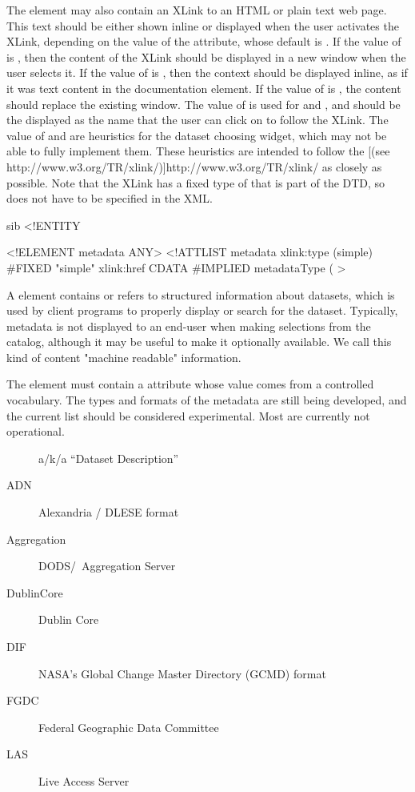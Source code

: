 The  element may also contain an XLink to an
HTML or plain text web page. This text should be either shown inline
or displayed when the user activates the XLink, depending on the value
of the  attribute, whose default is . If the
value of  is , then the content of the XLink
should be displayed in a new window when the user selects it. If the
value of  is , then the context should be
displayed inline, as if it was text content in the documentation
element.  If the value of  is , the
content should replace the existing window. The value of
 is used for  and , and should
be the displayed as the name that the user can click on to follow the
XLink. The value of  and  are
heuristics for the dataset choosing widget, which may not be able to
fully implement them. These heuristics are intended to follow the
[(see
http://www.w3.org/TR/xlink/)]{http://www.w3.org/TR/xlink/} as closely
as possible. Note that the XLink has a fixed type of  that
is part of the DTD, so does not have to be specified in the XML.

 

\begin{vcode}{sib}
<!ENTITY %

<!ELEMENT metadata ANY>
<!ATTLIST metadata
    xlink:type (simple) #FIXED "simple"
    xlink:href CDATA #IMPLIED
    metadataType (%
>
\end{vcode}

A  element contains or refers to structured
information about datasets, which is used by client programs to
properly display or search for the dataset.  Typically, metadata is
not displayed to an end-user when making selections from the catalog,
although it may be useful to make it optionally available. We call
this kind of content "machine readable" information.

The  element must contain a 
attribute whose value comes from a controlled vocabulary. The types
and formats of the metadata are still being developed, and the current
list should be considered experimental. Most are currently not
operational.

\begin{description}
\item[\thredds] a/k/a ``Dataset Description''
\item[ADN] Alexandria / DLESE format
\item[Aggregation] DODS/\opendap\ Aggregation Server
\item[DublinCore] Dublin Core
\item[DIF] NASA's Global Change Master Directory (GCMD) format
\item[FGDC] Federal Geographic Data Committee
\item[LAS] Live Access Server
\end{description}

